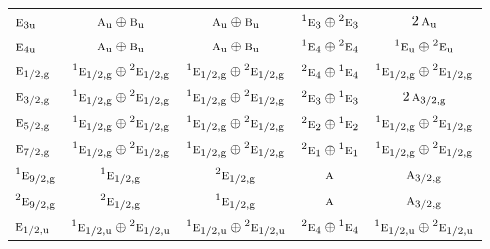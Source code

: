 \documentclass[10pt,a4paper]{article}
\numberwithin{equation}{section}
\newcommand{\irr}[1]{\text{\normalfont\scshape #1}}
\newcommand{\conjpair}[1]{{}^{#1}}
\newcommand{\ptag}[1]{\mathrm{#1}}
\begin{document}
{\begin{longtable}{@{}lcccc@{}}
$\irr{e}_{3\ptag{u}}$ & $\irr{a}_{\ptag{u}}\oplus \irr{b}_{\ptag{u}}$ & $\irr{a}_{\ptag{u}}\oplus \irr{b}_{\ptag{u}}$ & $\conjpair{1}\irr{e}_{3}\oplus \conjpair{2}\irr{e}_{3}$ & $2\,\irr{a}_{\ptag{u}}$\\
$\irr{e}_{4\ptag{u}}$ & $\irr{a}_{\ptag{u}}\oplus \irr{b}_{\ptag{u}}$ & $\irr{a}_{\ptag{u}}\oplus \irr{b}_{\ptag{u}}$ & $\conjpair{1}\irr{e}_{4}\oplus \conjpair{2}\irr{e}_{4}$ & $\conjpair{1}\irr{e}_{\ptag{u}}\oplus \conjpair{2}\irr{e}_{\ptag{u}}$\\
$\irr{e}_{1/2,\ptag{g}}$ & $\conjpair{1}\irr{e}_{1/2,\ptag{g}}\oplus \conjpair{2}\irr{e}_{1/2,\ptag{g}}$ & $\conjpair{1}\irr{e}_{1/2,\ptag{g}}\oplus \conjpair{2}\irr{e}_{1/2,\ptag{g}}$ & $\conjpair{2}\irr{e}_{4}\oplus \conjpair{1}\irr{e}_{4}$ & $\conjpair{1}\irr{e}_{1/2,\ptag{g}}\oplus \conjpair{2}\irr{e}_{1/2,\ptag{g}}$\\
$\irr{e}_{3/2,\ptag{g}}$ & $\conjpair{1}\irr{e}_{1/2,\ptag{g}}\oplus \conjpair{2}\irr{e}_{1/2,\ptag{g}}$ & $\conjpair{1}\irr{e}_{1/2,\ptag{g}}\oplus \conjpair{2}\irr{e}_{1/2,\ptag{g}}$ & $\conjpair{2}\irr{e}_{3}\oplus \conjpair{1}\irr{e}_{3}$ & $2\,\irr{a}_{3/2,\ptag{g}}$\\
$\irr{e}_{5/2,\ptag{g}}$ & $\conjpair{1}\irr{e}_{1/2,\ptag{g}}\oplus \conjpair{2}\irr{e}_{1/2,\ptag{g}}$ & $\conjpair{1}\irr{e}_{1/2,\ptag{g}}\oplus \conjpair{2}\irr{e}_{1/2,\ptag{g}}$ & $\conjpair{2}\irr{e}_{2}\oplus \conjpair{1}\irr{e}_{2}$ & $\conjpair{1}\irr{e}_{1/2,\ptag{g}}\oplus \conjpair{2}\irr{e}_{1/2,\ptag{g}}$\\
$\irr{e}_{7/2,\ptag{g}}$ & $\conjpair{1}\irr{e}_{1/2,\ptag{g}}\oplus \conjpair{2}\irr{e}_{1/2,\ptag{g}}$ & $\conjpair{1}\irr{e}_{1/2,\ptag{g}}\oplus \conjpair{2}\irr{e}_{1/2,\ptag{g}}$ & $\conjpair{2}\irr{e}_{1}\oplus \conjpair{1}\irr{e}_{1}$ & $\conjpair{1}\irr{e}_{1/2,\ptag{g}}\oplus \conjpair{2}\irr{e}_{1/2,\ptag{g}}$\\
$\conjpair{1}\irr{e}_{9/2,\ptag{g}}$ & $\conjpair{1}\irr{e}_{1/2,\ptag{g}}$ & $\conjpair{2}\irr{e}_{1/2,\ptag{g}}$ & $\irr{a}$ & $\irr{a}_{3/2,\ptag{g}}$\\
$\conjpair{2}\irr{e}_{9/2,\ptag{g}}$ & $\conjpair{2}\irr{e}_{1/2,\ptag{g}}$ & $\conjpair{1}\irr{e}_{1/2,\ptag{g}}$ & $\irr{a}$ & $\irr{a}_{3/2,\ptag{g}}$\\
$\irr{e}_{1/2,\ptag{u}}$ & $\conjpair{1}\irr{e}_{1/2,\ptag{u}}\oplus \conjpair{2}\irr{e}_{1/2,\ptag{u}}$ & $\conjpair{1}\irr{e}_{1/2,\ptag{u}}\oplus \conjpair{2}\irr{e}_{1/2,\ptag{u}}$ & $\conjpair{2}\irr{e}_{4}\oplus \conjpair{1}\irr{e}_{4}$ & $\conjpair{1}\irr{e}_{1/2,\ptag{u}}\oplus \conjpair{2}\irr{e}_{1/2,\ptag{u}}$\\

\end{longtable}}
\end{document}
